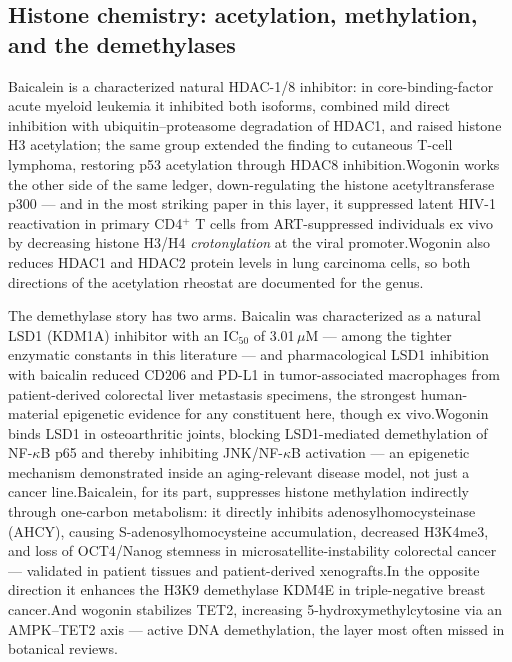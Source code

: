 \documentclass[11pt]{article}
\newcommand{\src}[1]{\allowbreak[#1]}
\begin{document}
\subsection{Histone chemistry: acetylation, methylation, and the demethylases}

Baicalein is a characterized natural HDAC-1/8 inhibitor: in core-binding-factor acute myeloid leukemia it inhibited both isoforms, combined mild direct inhibition with ubiquitin--proteasome degradation of HDAC1, and raised histone H3 acetylation; the same group extended the finding to cutaneous T-cell lymphoma, restoring p53 acetylation through HDAC8 inhibition.\src{131}\src{126} Wogonin works the other side of the same ledger, down-regulating the histone acetyltransferase p300 --- and in the most striking paper in this layer, it suppressed latent HIV-1 reactivation in primary CD4$^+$ T cells from ART-suppressed individuals ex vivo by decreasing histone H3/H4 \emph{crotonylation} at the viral promoter.\src{143} Wogonin also reduces HDAC1 and HDAC2 protein levels in lung carcinoma cells, so both directions of the acetylation rheostat are documented for the genus.\src{113}

The demethylase story has two arms. Baicalin was characterized as a natural LSD1 (KDM1A) inhibitor with an IC$_{50}$ of 3.01\,$\mu$M --- among the tighter enzymatic constants in this literature --- and pharmacological LSD1 inhibition with baicalin reduced CD206 and PD-L1 in tumor-associated macrophages from patient-derived colorectal liver metastasis specimens, the strongest human-material epigenetic evidence for any constituent here, though ex vivo.\src{117}\src{162} Wogonin binds LSD1 in osteoarthritic joints, blocking LSD1-mediated demethylation of NF-$\kappa$B p65 and thereby inhibiting JNK/NF-$\kappa$B activation --- an epigenetic mechanism demonstrated inside an aging-relevant disease model, not just a cancer line.\src{155} Baicalein, for its part, suppresses histone methylation indirectly through one-carbon metabolism: it directly inhibits adenosylhomocysteinase (AHCY), causing S-adenosylhomocysteine accumulation, decreased H3K4me3, and loss of OCT4/Nanog stemness in microsatellite-instability colorectal cancer --- validated in patient tissues and patient-derived xenografts.\src{156} In the opposite direction it enhances the H3K9 demethylase KDM4E in triple-negative breast cancer.\src{147} And wogonin stabilizes TET2, increasing 5-hydroxymethylcytosine via an AMPK--TET2 axis --- active DNA demethylation, the layer most often missed in botanical reviews.\src{223}
\end{document}
